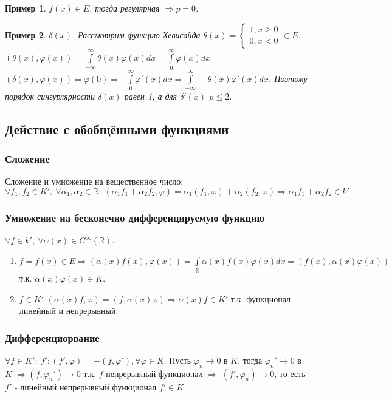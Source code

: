 \documentclass[9pt, a4paper]{article}
\newtheorem*{sample}{Пример}
\begin{document}
			\begin{sample}
				$f(x) \in E$, тогда регулярная $\Rightarrow p = 0$.
			\end{sample}
			\begin{sample}
				$\delta(x)$. Рассмотрим функцию Хевисайда $\theta(x)  =\begin{cases}
					1, x \geq 0 \\
					0, x < 0
				\end{cases} \in E$. $(\theta(x), \varphi(x)) = \int\limits_{-\infty}^{\infty} \theta(x) \varphi(x) dx = \int\limits_{0}^{\infty} \varphi(x) dx$ \newline
				$(\delta(x), \varphi(x)) = \varphi(0)  = - \int\limits_{0}^{\infty} \varphi'(x) dx = \int\limits_{-\infty}^{\infty} - \theta(x) \varphi'(x) dx$. Поэтому порядок сингурлярности $\delta(x)$ равен 1, а для $\delta'(x)$ $p \leq 2$.
			\end{sample}
	\subsection*{Действие с обобщёнными функциями}
		\subsubsection*{Сложение}
			Сложение и умножение на вещественное число: $\forall f_1, f_2 \in K', \ \forall \alpha_1, \alpha_2 \in \mathbb{R}: \ (\alpha_1f_1+\alpha_2f_2, \varphi) = \alpha_1(f_1, \varphi)+\alpha_2(f_2, \varphi) \Rightarrow \alpha_1f_1+\alpha_2f_2 \in k'$
		\subsubsection*{Умножение на бесконечно дифференцируемую функцию}
			$\forall f \in k', \ \forall \alpha(x) \in C^\infty (\mathbb{R})$. 
			\begin{enumerate}
				\item $f = f(x) \in E \Rightarrow (\alpha(x)f(x), \varphi(x)) = \int\limits_{\mathbb{R}} \alpha(x)f(x)\varphi(x) dx = (f(x), \alpha(x)\varphi(x))$ т.к. $\alpha(x)\varphi(x) \in K$.
				\item $f \in K'$ $(\alpha(x)f, \varphi) = (f, \alpha(x)\varphi) \Rightarrow \alpha(x) f \in K'$ т.к. функционал линейный и непрерывный.
			\end{enumerate}
		\subsubsection*{Дифференциорвание}
			$\forall f \in K': \ f':(f', \varphi) = -(f, \varphi'), \forall \varphi \in K$. Пусть $\varphi_n \to 0$ в $K$, тогда $\varphi_n' \to 0 $ в $K$ $\Rightarrow (f, \varphi_n') \to 0$ т.к. $f$-непрерывный функционал $\Rightarrow$  $(f', \varphi_n) \to 0$, то есть  $f'$ - линейный непрерывный функционал $f' \in K$.
			
\end{document}
